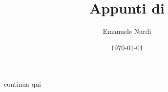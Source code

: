 \documentclass[class=article, crop=false, 12pt]{standalone}
\title{Appunti di {\Java}}
\author{Emanuele Nardi}
\date{\today}
\begin{document}
\maketitle


continua qui
\end{document}
